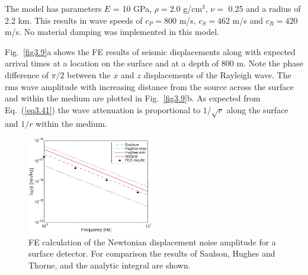 The model has parameters $E$ = 10 GPa, $\rho=2.0$ g/cm$^3$, $\nu=$ 0.25 and a radius of 2.2 km. This results in wave speeds of $c_P = 800$ m/s, $c_S = 462$ m/s and $c_R = 420$ m/s. No material damping was implemented in this model. 

Fig.~\ref{fig3.9}a shows the FE results of seismic displacements along with expected arrival times at a location on the surface and at a depth of 800 m. Note the phase difference of $\pi/2$ between the $x$ and $z$ displacements of the Rayleigh wave. The rms wave amplitude with increasing distance from the source across the surface and within the medium are plotted in Fig.~\ref{fig3.9}b. As expected from Eq.~(\ref{eq3.41}) the wave attenuation is proportional to $1/\sqrt{r}$ along the surface and $1/r$ within the medium. 
\begin{figure}[t] 
  \begin{center}
   \includegraphics[width=0.49\textwidth]{./Sec_SiteInfra/Figures/ThorneSaulFEMcomparison_surface2.pdf} 
   \caption{FE calculation of the Newtonian displacement noise amplitude for a surface detector. For comparison the results of Saulson, Hughes and Thorne, and the analytic integral are shown.}
   \label{fig:FEresult}
   \end{center}
\end{figure}

